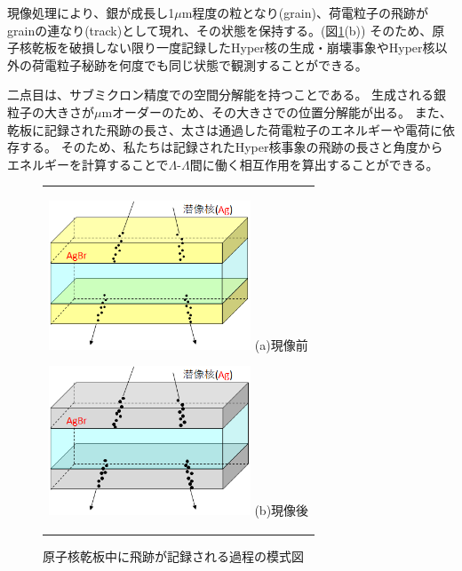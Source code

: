\documentclass[12pt,a4paper]{jarticle}
\begin{document}
現像処理により、銀が成長し1$\mu$m程度の粒となり(grain)、荷電粒子の飛跡がgrainの連なり(track)として現れ、その状態を保持する。(図\ref{fig:process_recored_track}(b))
そのため、原子核乾板を破損しない限り一度記録したHyper核の生成・崩壊事象やHyper核以外の荷電粒子秘跡を何度でも同じ状態で観測することができる。
\par
二点目は、サブミクロン精度での空間分解能を持つことである。
生成される銀粒子の大きさが$\mu$mオーダーのため、その大きさでの位置分解能が出る。
また、乾板に記録された飛跡の長さ、太さは通過した荷電粒子のエネルギーや電荷に依存する。
そのため、私たちは記録されたHyper核事象の飛跡の長さと角度からエネルギーを計算することで$\Lambda$-$\Lambda$間に働く相互作用を算出することができる。
\begin{figure}[htbp]
  \centering
      \begin{tabular}{c}
        \begin{minipage}{0.5\hsize}
          \centering
            \includegraphics[clip, width=60mm]{process_bdev.png}
            \hspace{1.6cm} (a)現像前
        \end{minipage}
        
        \begin{minipage}{0.5\hsize}
          \centering
            \includegraphics[clip, width=60mm]{process_adev.png}
            \hspace{1.6cm} (b)現像後
        \end{minipage}
    
      \end{tabular}
      \caption{原子核乾板中に飛跡が記録される過程の模式図\label{fig:process_recored_track}}
\end{figure}
\end{document}
